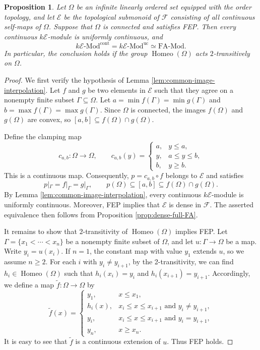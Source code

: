 \documentclass[10pt, reqno]{amsart}
\theoremstyle{plain}
\newtheorem{proposition}[theorem]{Proposition}
\numberwithin{equation}{section}
\theoremstyle{definition}
\newcommand{\Homeo}{\operatorname{Homeo}}
\newcommand{\Mod}{{\textrm{-}\mathrm{Mod}}}
\newcommand{\FA}{\mathrm{FA}}
\newcommand{\E}{\mathscr E}
\begin{document}
\begin{proposition}\label{prop:ordered-space-FA}
Let $\Omega$ be an infinite linearly ordered set equipped with the order topology, and let $\E$ be the topological submonoid of $\mathscr{F}$ consisting of all continuous self-maps of $\Omega$. Suppose that $\Omega$ is connected and satisfies FEP. Then every continuous $k\E$-module is uniformly continuous, and
\[
k\E\Mod^{\mathrm{cont}} = k\E\Mod^{\mathrm{uc}} \simeq \FA \Mod.
\]
In particular, the conclusion holds if the group $\Homeo(\Omega)$ acts $2$-transitively on $\Omega$.
\end{proposition}

\begin{proof}
We first verify the hypothesis of Lemma \ref{lem:common-image-interpolation}. Let $f$ and $g$ be two elements in $\E$ such that they agree on a nonempty finite subset $\Gamma \subseteq \Omega$. Let $a = \min f(\Gamma) = \min g(\Gamma)$ and $b = \max f(\Gamma) = \max g(\Gamma)$. Since $\Omega$ is connected, the images $f(\Omega)$ and $g(\Omega)$ are convex, so $[a,b] \subseteq f(\Omega) \cap g(\Omega)$.

Define the clamping map
\[
c_{a,b}: \Omega \longrightarrow \Omega, \qquad
c_{a,b}(y)=
\begin{cases}
a, & y \leqslant a,\\
y, & a \leqslant y \leqslant b,\\
b, & y \geqslant b.
\end{cases}
\]
This is a continuous map. Consequently, $p = c_{a,b} \circ f$ belongs to $\E$ and satisfies
\[
p|_\Gamma=f|_\Gamma=g|_\Gamma, \qquad p(\Omega) \subseteq[a,b] \subseteq f(\Omega) \cap g(\Omega).
\]
By Lemma \ref{lem:common-image-interpolation}, every continuous $k\E$-module is uniformly continuous. Moreover, FEP implies that $\E$ is dense in $\mathscr{F}$. The asserted equivalence then follows from Proposition \ref{prop:dense-full-FA}.

It remains to show that $2$-transitivity of $\Homeo(\Omega)$ implies FEP. Let $\Gamma = \{x_1 < \cdots <x_n\}$ be a nonempty finite subset of $\Omega$, and let $u: \Gamma \to \Omega$ be a map. Write $y_i=u(x_i)$. If $n=1$, the constant map with value $y_1$ extends $u$, so we assume $n \geqslant 2$. For each $i$ with $y_i \neq y_{i+1}$, by the 2-transitivity, we can find $h_i \in \Homeo(\Omega)$ such that $h_i(x_i) = y_i$ and $h_i(x_{i+1}) = y_{i+1}$. Accordingly, we define a map $\widetilde{f}: \Omega \to \Omega$ by
\[
\widetilde{f}(x) =
\begin{cases}
y_1, & x \leqslant x_1,\\
h_i(x), & x_i \leqslant x \leqslant x_{i+1}  \text{ and } y_i \neq y_{i+1},\\
y_i, & x_i \leqslant x \leqslant x_{i+1}  \text{ and } y_i = y_{i+1},\\
y_n, & x \geqslant x_n.
\end{cases}
\]
It is easy to see that $\widetilde{f}$ is a continuous extension of $u$. Thus FEP holds.
\end{proof}
\end{document}
